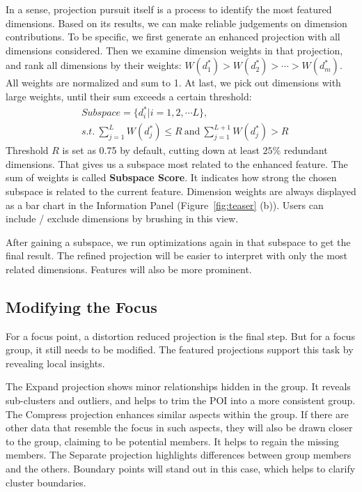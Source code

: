 In a sense, projection pursuit itself is a process to identify the most featured dimensions. Based on its results, we can make reliable judgements on dimension contributions. To be specific, we first generate an enhanced projection with all dimensions considered. Then we examine dimension weights in that projection, and rank all dimensions by their weights: $W(d_{1}^{*}) > W(d_{2}^{*}) > \cdots >W(d_{m}^{*})$. All weights are normalized and sum to 1. At last, we pick out dimensions with large weights, until their sum exceeds a certain threshold:
\begin{equation}
\begin{split}
&Subspace = \{d_{i}^{*}| i = 1,2, \cdots L \},\\
&s.t.\ \sum\limits_{j=1}^{L} W(d_{j}^{*}) \leq R \ \text{and}\ \sum\limits_{j=1}^{L+1} W(d_{j}^{*}) > R
\end{split}
\end{equation}
Threshold $R$ is set as 0.75 by default, cutting down at least $25\%$ redundant dimensions. That gives us a subspace most related to the enhanced feature. The sum of weights is called \textbf{Subspace Score}. It indicates how strong the chosen subspace is related to the current feature.  Dimension weights are always displayed as a bar chart in the Information Panel (Figure~\ref{fig:teaser} (b)). Users can include / exclude dimensions by brushing in this view.

After gaining a subspace, we run optimizations again in that subspace to get the final result. The refined projection will be easier to interpret with only the most related dimensions. Features will also be more prominent.


\subsection{Modifying the Focus}
For a focus point, a distortion reduced projection is the final step. But for a focus group, it still needs to be modified. The featured projections support this task by revealing local insights.

The Expand projection shows minor relationships hidden in the group. It reveals sub-clusters and outliers, and helps to trim the POI into a more consistent group. The Compress projection enhances similar aspects within the group. If there are other data that resemble the focus in such aspects, they will also be drawn closer to the group, claiming to be potential members. It helps to regain the missing members. The Separate projection highlights differences between group members and the others. Boundary points will stand out in this case, which helps to clarify cluster boundaries.

